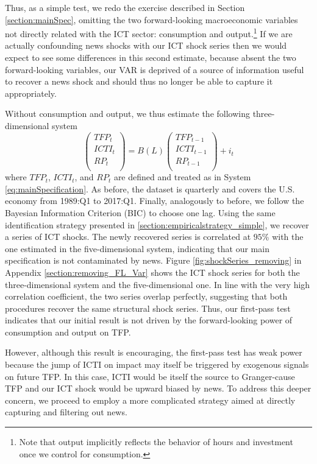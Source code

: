 \documentclass[12pt]{article}
\begin{document}
Thus, as a simple test, we redo the exercise described in Section \ref{section:mainSpec}, omitting the two forward-looking macroeconomic variables not directly related with the ICT sector: consumption and output.\footnote{Note that output implicitly reflects the behavior of hours and investment once we control for consumption.} If we are actually confounding news shocks with our ICT shock series then we would expect to see some differences in this second estimate, because absent the two forward-looking variables, our VAR is deprived of a source of information useful to recover a news shock and should thus no longer be able to capture it appropriately.

Without consumption and output, we thus estimate the following three-dimensional system
\begin{equation}\label{eq:noForVariables}
\begin{pmatrix}
TFP_t \\ 
ICTI_t \\
RP_t \\
\end{pmatrix} = B(L) \begin{pmatrix}
TFP_{t-1} \\ 
ICTI_{t-1} \\
RP_{t-1} \\
\end{pmatrix} + i_t
\end{equation}
where  $TFP_t$, $ICTI_{t}$, and $RP_t$ are defined and treated as in System \ref{eq:mainSpecification}. As before, the dataset is quarterly and covers the U.S. economy from 1989:Q1 to 2017:Q1. Finally, analogously to before, we follow the Bayesian Information Criterion (BIC) to choose one lag. Using the same identification strategy presented in \ref{section:empiricalstrategy_simple}, we recover a series of ICT shocks. The newly recovered series is correlated at $95$\% with the one estimated in the five-dimensional system, indicating that our main specification is not contaminated by news. Figure \ref{fig:shockSeries_removing} in Appendix \ref{section:removing_FL_Var} shows the ICT shock series for both the three-dimensional system and the five-dimensional one. In line with the very high correlation coefficient, the two series overlap perfectly, suggesting that both procedures recover the same structural shock series. Thus, our first-pass test indicates that our initial result is not driven by the forward-looking power of consumption and output on TFP. 

However, although this result is encouraging, the first-pass test has weak power because the jump of ICTI on impact may itself be triggered by exogenous signals on future TFP. In this case, ICTI would be itself the source to Granger-cause TFP and our ICT shock would be upward biased by news. To address this deeper concern, we proceed to employ a more complicated strategy aimed at directly capturing and filtering out news. 
\end{document}
